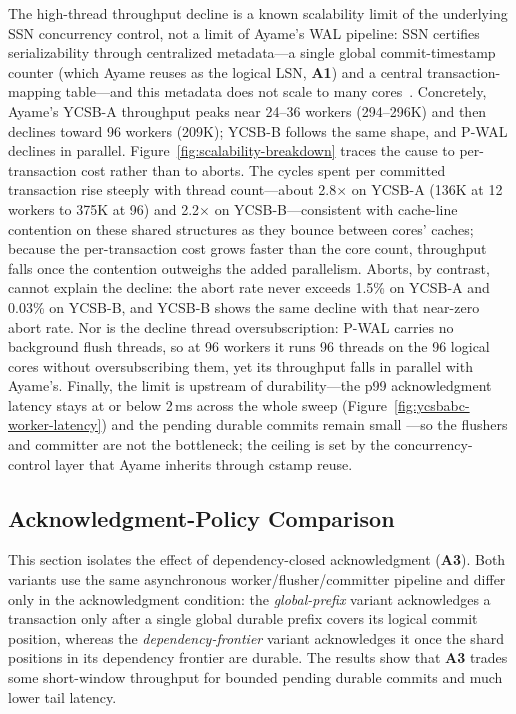 The high-thread throughput decline is a known scalability limit of the
underlying SSN concurrency control, not a limit of Ayame's WAL pipeline: SSN
certifies serializability through centralized metadata---a single global
commit-timestamp counter (which Ayame reuses as the logical LSN, \textbf{A1})
and a central transaction-mapping table---and this metadata does not scale to
many cores~\cite{tanabe2020ccbench}.  Concretely, Ayame's YCSB-A throughput
peaks near 24--36 workers (294--296K) and then declines toward 96 workers
(209K); YCSB-B follows the same shape, and P-WAL declines in parallel.
Figure~\ref{fig:scalability-breakdown} traces the cause to per-transaction cost
rather than to aborts.  The cycles spent per committed transaction rise steeply
with thread count---about 2.8$\times$ on YCSB-A (136K at 12 workers to 375K at
96) and 2.2$\times$ on YCSB-B---consistent with cache-line contention on these
shared structures as they bounce between cores' caches; because the
per-transaction cost grows faster than the core count, throughput falls once the
contention outweighs the added parallelism.  Aborts, by contrast, cannot explain
the decline: the abort rate never exceeds 1.5\% on YCSB-A and 0.03\% on YCSB-B,
and YCSB-B shows the same decline with that near-zero abort rate.  Nor is the
decline thread oversubscription: P-WAL carries no background flush threads, so at
96 workers it runs 96 threads on the 96 logical cores without oversubscribing
them, yet its throughput falls in parallel with Ayame's.  Finally, the limit is
upstream of durability---the p99 acknowledgment latency stays at or below 2\,ms
across the whole sweep (Figure~\ref{fig:ycsbabc-worker-latency}) and the pending
durable commits remain small ---so the
flushers and committer are not the bottleneck; the ceiling is set by the
concurrency-control layer that Ayame inherits through cstamp reuse.

\subsection{Acknowledgment-Policy Comparison}
\label{sec:why-dep}

This section isolates the effect of dependency-closed acknowledgment
(\textbf{A3}).  Both variants use the same asynchronous worker/flusher/committer
pipeline and differ only in the acknowledgment condition: the
\emph{global-prefix} variant acknowledges a transaction only after a single
global durable prefix covers its logical commit position, whereas the
\emph{dependency-frontier} variant acknowledges it once the shard positions in
its dependency frontier are durable.  The results show that \textbf{A3} trades
some short-window throughput for bounded pending durable commits and much lower
tail latency.

